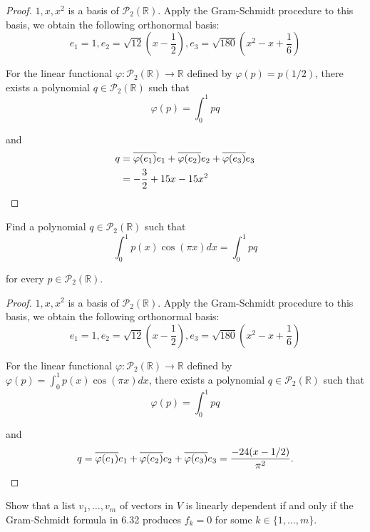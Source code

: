 \begin{proof}
    $1, x, x^{2}$ is a basis of $\mathscr{P}_{2}(\mathbb{R})$. Apply the Gram-Schmidt procedure to this basis, we obtain the following orthonormal basis:
    \[
        e_{1} = 1, e_{2} = \sqrt{12}\left(x - \frac{1}{2}\right), e_{3} = \sqrt{180}\left(x^{2} - x + \frac{1}{6}\right)
    \]

    For the linear functional $\varphi: \mathscr{P}_{2}(\mathbb{R})\to \mathbb{R}$ defined by $\varphi(p) = p(1/2)$, there exists a polynomial $q\in\mathscr{P}_{2}(\mathbb{R})$ such that
    \[
        \varphi(p) = \int^{1}_{0}pq
    \]

    and
    \begin{align*}
        q & = \overline{\varphi(e_{1})}e_{1} + \overline{\varphi(e_{2})}e_{2} + \overline{\varphi(e_{3})}e_{3} \\
          & = -\frac{3}{2} + 15x - 15x^{2}
    \end{align*}
\end{proof}
\newpage

\begin{exercise}
    Find a polynomial $q\in\mathscr{P}_{2}(\mathbb{R})$ such that
    \[
        \int^{1}_{0}p(x)\cos(\pi x)dx = \int^{1}_{0}pq
    \]

    for every $p\in\mathscr{P}_{2}(\mathbb{R})$.
\end{exercise}

\begin{proof}
    $1, x, x^{2}$ is a basis of $\mathscr{P}_{2}(\mathbb{R})$. Apply the Gram-Schmidt procedure to this basis, we obtain the following orthonormal basis:
    \[
        e_{1} = 1, e_{2} = \sqrt{12}\left(x - \frac{1}{2}\right), e_{3} = \sqrt{180}\left(x^{2} - x + \frac{1}{6}\right)
    \]

    For the linear functional $\varphi: \mathscr{P}_{2}(\mathbb{R})\to \mathbb{R}$ defined by $\varphi(p) = \int^{1}_{0}p(x)\cos(\pi x)dx$, there exists a polynomial $q\in\mathscr{P}_{2}(\mathbb{R})$ such that
    \[
        \varphi(p) = \int^{1}_{0}pq
    \]

    and
    \[
        q = \overline{\varphi(e_{1})}e_{1} + \overline{\varphi(e_{2})}e_{2} + \overline{\varphi(e_{3})}e_{3} = \frac{-24(x - 1/2)}{\pi^{2}}.
    \]
\end{proof}
\newpage

\begin{exercise}
    Show that a list $v_{1} , \ldots, v_{m}$ of vectors in $V$ is linearly dependent if and only if the Gram-Schmidt formula in 6.32 produces $f_{k} = 0$ for some $k \in \{1, \ldots, m\}$.
\end{exercise}

